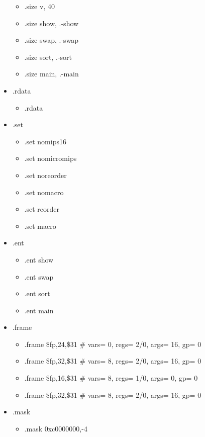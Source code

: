 \documentclass[12pt]{article}
\begin{document}
\begin{itemize}
  \begin{itemize}
  \item .size v, 40
  \item .size show, .-show
  \item .size swap, .-swap
  \item .size sort, .-sort
  \item .size	main, .-main
  \end{itemize}
\item .rdata\\
  \begin{itemize}
  \item .rdata
  \end{itemize}
\item .set\\
  \begin{itemize}
  \item .set nomips16
  \item .set nomicromips
  \item .set noreorder
  \item .set nomacro
  \item .set reorder
  \item .set macro
  \end{itemize}
\item .ent\\
  \begin{itemize}
  \item .ent show
  \item .ent swap
  \item .ent sort
  \item .ent main
  \end{itemize}
\item .frame\\
  \begin{itemize}
  \item .frame \$fp,24,\$31 \# vars= 0, regs= 2/0, args= 16, gp= 0
  \item .frame \$fp,32,\$31 \# vars= 8, regs= 2/0, args= 16, gp= 0
  \item .frame \$fp,16,\$31 \# vars= 8, regs= 1/0, args= 0, gp= 0
  \item .frame \$fp,32,\$31 \# vars= 8, regs= 2/0, args= 16, gp= 0
  \end{itemize}
\item .mask\\
  \begin{itemize}
  \item .mask	0xc0000000,-4
  \end{itemize}

\end{itemize}
\end{document}
